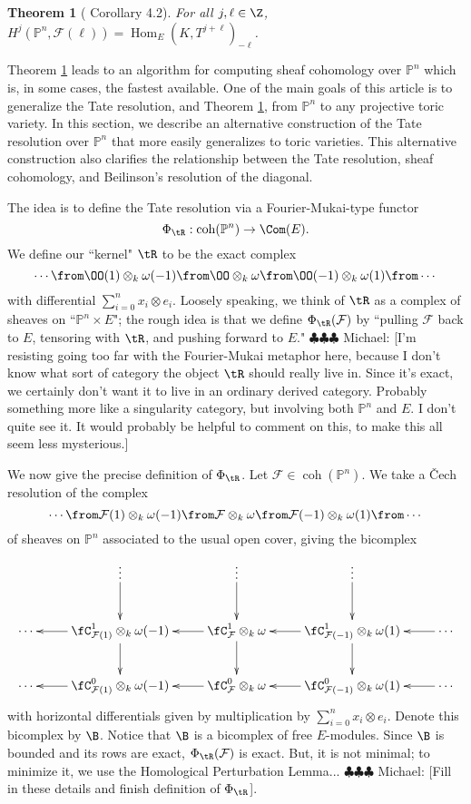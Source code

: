 \documentclass[12pt]{amsart}
\newtheorem{thm}[lemma]{Theorem}
\theoremstyle{definition}
\theoremstyle{remark}
\newcommand{\PP}{\mathbb P}
\newcommand{\Hom}{\operatorname{Hom}} %
\newcommand{\F}{\FF}
\newcommand{\michael}[1]{{\color{red} \sf $\clubsuit\clubsuit\clubsuit$ Michael: [#1]}}
\def\on{\operatorname}
\def\om{\omega}
\def\F{\mathcal{F}}
\def\om{\omega}
\def\l{\ell}
\begin{document}
\begin{thm}[\cite{EFS} Corollary 4.2]
\label{EFS}
For all $j, \l \in \Z$, $H^j(\PP^n, \F(\l)) = \Hom_E(K, T^{j + \l})_{-\l}$.
\end{thm}
Theorem \ref{EFS} leads to an algorithm for computing sheaf cohomology over $\PP^n$ which is, in some cases, the fastest available. One of the main goals of this article is to generalize the Tate resolution, and Theorem \ref{EFS}, from $\PP^n$ to any projective toric variety. In this section, we describe an alternative construction of the Tate resolution over $\PP^n$ that more easily generalizes to toric varieties. This alternative construction also clarifies the relationship between the Tate resolution, sheaf cohomology, and Beilinson's resolution of the diagonal. 

The idea is to define the Tate resolution via a Fourier-Mukai-type functor
$$
\Phi_{\tR}: \on{coh}(\PP^n) \to \Com(E).
$$
We define our ``kernel" $\tR$ to be the exact complex 
$$
\cdots \from \OO(1) \otimes_k \om(-1) \from \OO \otimes_k \om \from \OO(-1) \otimes_k \om(1) \from \cdots
$$
with differential $\sum_{i = 0}^n x_i \otimes e_i$. Loosely speaking, we think of $\tR$ as a complex of sheaves on ``$\PP^n \times E$"; the rough idea is that we define $\Phi_{\tR}(\F)$ by ``pulling $\F$ back to $E$, tensoring with $\tR$, and pushing forward to $E$." \michael{I'm resisting going too far with the Fourier-Mukai metaphor here, because I don't know what sort of category the object $\tR$ should really live in. Since it's exact, we certainly don't want it to live in an ordinary derived category. Probably something more like a singularity category, but involving both $\PP^n$ and $E$. I don't quite see it. It would probably be helpful to comment on this, to make this all seem less mysterious.} 

We now give the precise definition of $\Phi_{\tR}$. Let $\F \in \on{coh}(\PP^n)$. We take a \v{C}ech resolution of the complex
$$
\cdots \from \F(1) \otimes_k \om(-1) \from \F \otimes_k \om \from \F(-1) \otimes_k \om(1) \from \cdots
$$
of sheaves on $\PP^n$ associated to the usual open cover, giving the bicomplex
$$
\xymatrix{
 & \vdots \ar[d] & \vdots \ar[d]  & \vdots \ar[d] &\\
\cdots  & \fC^1_{\F(1)} \otimes_k \om(-1) \ar[l] \ar[d] & \fC^1_{\F} \otimes_k \om \ar[l] \ar[d]  & \fC^1_{\F(-1)} \otimes_k \om(1) \ar[l] \ar[d] & \ar[l] \cdots \\
\cdots & \fC^0_{\F(1)} \otimes_k \om(-1) \ar[l] & \fC^0_{\F} \otimes_k \om \ar[l] & \fC^0_{\F(-1)} \otimes_k \om(1) \ar[l] & \ar[l]  \cdots
}
$$
with horizontal differentials given by multiplication by $\sum_{i = 0}^n x_i \otimes e_i$. Denote this bicomplex by $\B$. Notice that $\B$ is a bicomplex of free $E$-modules. Since $\B$ is bounded and its rows are exact, $\Phi_{\tR}(\F)$ is exact. But, it is not minimal; to minimize it, we use the Homological Perturbation Lemma...\michael{Fill in these details and finish definition of $\Phi_{\tR}$}.
\end{document}
